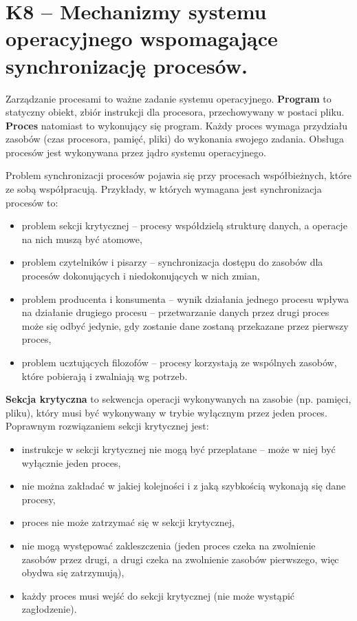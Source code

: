 \sloppy\section{K8 -- Mechanizmy systemu operacyjnego wspomagające synchronizację procesów.}

Zarządzanie procesami to ważne zadanie systemu operacyjnego. \textbf{Program} to statyczny obiekt, zbiór instrukcji dla procesora, przechowywany w postaci pliku. \textbf{Proces} natomiast to wykonujący się program. Każdy proces wymaga przydziału zasobów (czas procesora, pamięć, pliki) do wykonania swojego zadania. Obsługa procesów jest wykonywana przez jądro systemu operacyjnego.

Problem synchronizacji procesów pojawia się przy procesach współbieżnych, które ze sobą współpracują. Przykłady, w których wymagana jest synchronizacja procesów to:
\begin{itemize}
\item problem sekcji krytycznej -- procesy współdzielą strukturę danych, a operacje na nich muszą być atomowe,
\item problem czytelników i pisarzy -- synchronizacja dostępu do zasobów dla procesów dokonujących i niedokonujących w nich zmian,
\item problem producenta i konsumenta -- wynik działania jednego procesu wpływa na działanie drugiego procesu -- przetwarzanie danych przez drugi proces może się odbyć jedynie, gdy zostanie dane zostaną przekazane przez pierwszy proces,
\item problem ucztujących filozofów -- procesy korzystają ze wspólnych zasobów, które pobierają i zwalniają wg potrzeb.
\end{itemize}

\textbf{Sekcja krytyczna} to sekwencja operacji wykonywanych na zasobie (np. pamięci, pliku), który musi być wykonywany w trybie wyłącznym przez jeden proces. Poprawnym rozwiązaniem sekcji krytycznej jest:
\begin{itemize}
\item instrukcje w sekcji krytycznej nie mogą być przeplatane -- może w niej być wyłącznie jeden proces,
\item nie można zakładać w jakiej kolejności i z jaką szybkością wykonają się dane procesy,
\item proces nie może zatrzymać się w sekcji krytycznej,
\item nie mogą występować zakleszczenia (jeden proces czeka na zwolnienie zasobów przez drugi, a drugi czeka na zwolnienie zasobów pierwszego, więc obydwa się zatrzymują),
\item każdy proces musi wejść do sekcji krytycznej (nie może wystąpić zagłodzenie).
\end{itemize}

